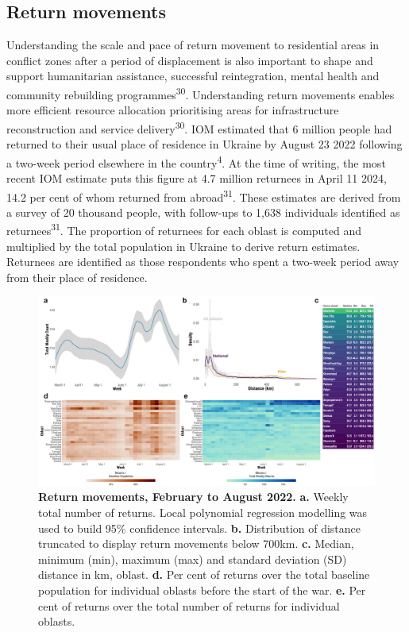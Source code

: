 \documentclass[
  11pt,
]{article}
\begin{document}
\subsection{Return movements}\label{sec-return}

Understanding the scale and pace of return movement to residential areas
in conflict zones after a period of displacement is also important to
shape and support humanitarian assistance, successful reintegration,
mental health and community rebuilding programmes\textsuperscript{30}.
Understanding return movements enables more efficient resource
allocation prioritising areas for infrastructure reconstruction and
service delivery\textsuperscript{30}. IOM estimated that 6 million
people had returned to their usual place of residence in Ukraine by
August 23 2022 following a two-week period elsewhere in the
country\textsuperscript{4}. At the time of writing, the most recent IOM
estimate puts this figure at 4.7 million returnees in April 11 2024,
14.2 per cent of whom returned from abroad\textsuperscript{31}. These
estimates are derived from a survey of 20 thousand people, with
follow-ups to 1,638 individuals identified as
returnees\textsuperscript{31}. The proportion of returnees for each
oblast is computed and multiplied by the total population in Ukraine to
derive return estimates. Returnees are identified as those respondents
who spent a two-week period away from their place of residence.

\begin{figure}[h]

\begin{minipage}{\linewidth}

\includegraphics[width=\textwidth,height=0.5\textheight]{../outputs/2_3/dougs_returns/fig3.pdf}

\end{minipage}%

\caption{\label{fig-returns}\textbf{Return movements, February to August
2022.} \textbf{a.} Weekly total number of returns. Local polynomial
regression modelling was used to build 95\% confidence intervals.
\textbf{b.} Distribution of distance truncated to display return
movements below 700km. \textbf{c.} Median, minimum (min), maximum (max)
and standard deviation (SD) distance in km, oblast. \textbf{d.} Per cent
of returns over the total baseline population for individual oblasts
before the start of the war. \textbf{e.} Per cent of returns over the
total number of returns for individual oblasts.}

\end{figure}%
\end{document}
